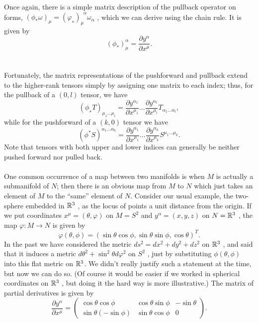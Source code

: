 Once again, there is a simple matrix description of the pullback operator on forms, $(\phi_* ω)_μ =
(φ_∗ )^{\; \; \alpha}_μ ω_α$ , which we can derive using the chain rule. It is given by
\begin{equation}
	(\phi_*)^\alpha_\mu = \frac{\partial y^\alpha}{\partial x^\mu}.
\end{equation}
\\
\\
Fortunately, the matrix representations of the pushforward and pullback extend to
the higher-rank tensors simply by assigning one matrix to each index; thus, for the pullback
of a $(0, l)$ tensor, we have
\begin{equation}
(\phi_∗ T )_{ μ_1 \dots μ_l} = \frac{\partial y^{\alpha_1}}{\partial x^{\mu_1}} \dots \frac{\partial y^{\alpha_l}}{\partial x^{\mu_l}} T_{\alpha_1 \dots \alpha_l},
\end{equation}
while for the pushforward of a $(k, 0)$ tensor we have
\begin{equation}
	(\phi^* S)^{\alpha_1 \dots \alpha_k} = \frac{\partial y^{\alpha_1}}{\partial x^{\mu_1}} \dots \frac{\partial y^{\alpha_k}}{\partial x^{\mu_k}} S^{\mu_1 \dots \mu_k}.
\end{equation}
Note that tensors with both upper and lower indices can generally be neither pushed forward
nor pulled back.\\
\\
One common occurrence of a map between two manifolds is when $M$ is actually a
submanifold of $N$; then there is an obvious map from $M$ to $N$ which just takes an element
of $M$ to the “same” element of $N$. Consider our usual example, the two-sphere embedded in
$\mathbb{R}^3$ , as the locus of points a unit distance from the origin. If we put coordinates $x^μ = (θ, φ)$
on $M = S^2$ and $y^α = (x, y, z)$ on  $N = \mathbb{R}^3$ , the map $φ : M → N$ is given by
\begin{equation}
\varphi(\theta, \phi) = ( \sin\theta \cos \phi, \sin\theta \sin \phi, \cos \theta)^T.
\end{equation}
In the past we have considered the metric $ds^2 = dx^2 + dy^2 + dz^2$ on $\mathbb{R}^3$ , and said that it
induces a metric $dθ^2 + \sin^2 θ dφ^2$ on $S^2$ , just by substituting $\phi(\theta,\phi)$ into this flat metric on $\mathbb{R}^3$. We didn’t really justify such a statement at the time, but now we can do so. (Of course
it would be easier if we worked in spherical coordinates on $\mathbb{R}^3$ , but doing it the hard way is
more illustrative.) The matrix of partial derivatives is given by
\begin{equation}
\frac{\partial y^\alpha}{\partial x^\mu} = \begin{pmatrix}
\cos \theta \cos \phi & \cos \theta \sin \phi & -\sin \theta \\
\sin \theta (-\sin\phi) & \sin \theta \cos \phi & 0 
\end{pmatrix}.
\end{equation}
